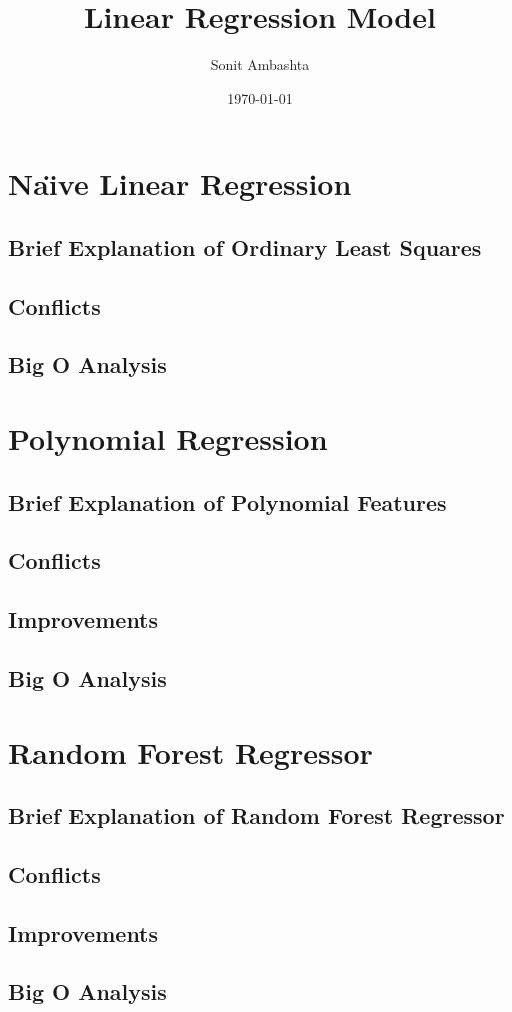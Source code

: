\documentclass{article}
\title{Linear Regression Model}
\author{Sonit Ambashta}
\date{\today}
\begin{document}
\maketitle
    \section{Na\"{\i}ve Linear Regression}
        \subsection{Brief Explanation of Ordinary Least Squares}
        \subsection{Conflicts}
        \subsection{Big O Analysis}
    \section{Polynomial Regression}
        \subsection{Brief Explanation of Polynomial Features}
        \subsection{Conflicts}
        \subsection{Improvements}
        \subsection{Big O Analysis}
    \section{Random Forest Regressor}
        \subsection{Brief Explanation of Random Forest Regressor}
        \subsection{Conflicts}
        \subsection{Improvements}
        \subsection{Big O Analysis}
\end{document}
